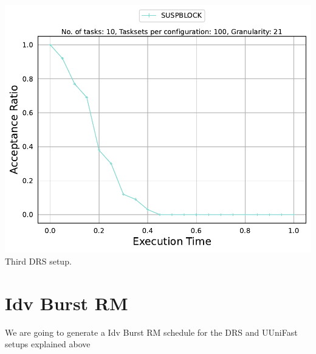 \documentclass[]{article}
\begin{document}
\begin{minipage}[t]{0.48\linewidth}
		\includegraphics[width=\linewidth]{SUSPBLOCK_3rdSetup_DRS.pdf}
		Third DRS setup.
		\vspace{0.3cm}
	\end{minipage}


	\clearpage
	\section{Idv Burst RM}
{
\raggedleft We are going to generate a Idv Burst RM schedule for the DRS and UUniFast setups explained above \newline 
}
\end{document}
